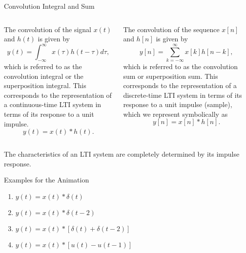 \begin{frame}{Convolution Integral and Sum}
    \begin{columns}
        \begin{column}{0.5\textwidth}
            The convolution of the signal $x(t)$ and $h(t)$ is given by
            \begin{equation*}
                \boxed{y(t) = \int_{-\infty}^{\infty} x(\tau)h(t - \tau)d\tau,}
            \end{equation*}
            which is referred to as the \alert{convolution integral} or the \alert{superposition integral}. This  corresponds to the representation of a continuous-time LTI system in terms of its response to a unit impulse.
            \begin{equation*}
                y(t) = x(t) \ast h(t).
            \end{equation*}                   
        \end{column}
        \begin{column}{0.5\textwidth}
            The convolution of the sequence $x[n]$ and $h[n]$ is given by
            \begin{equation}\label{eq:convolution_sum}
                \boxed{y[n] = \sum_{k=-\infty}^{\infty}x[k]h[n-k],}
            \end{equation}
            which is referred to as the \alert{convolution sum} or \alert{superposition sum}. This corresponds to the representation of a discrete-time LTI system in terms of its response to a unit impulse (sample), which we represent symbolically as
            \begin{equation}\label{eq:convolution_symbol}
                y[n] = x[n]\ast h[n].
            \end{equation}          
        \end{column}               
    \end{columns}
    \vspace*{1cm}
    \noindent The characteristics of an LTI system are completely determined  by its impulse response.      
\end{frame}

\begin{frame}{Examples for the Animation}
    \begin{enumerate}
        \item $y(t) = x(t) \ast \delta(t)$
        \item $y(t) = x(t) \ast \delta(t - 2)$
        \item $y(t) = x(t) \ast [\delta(t) + \delta(t - 2)]$
        \item $y(t) = x(t) \ast [u(t) - u(t-1)]$
    \end{enumerate}
\end{frame}

